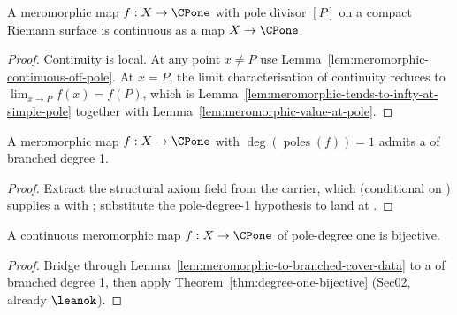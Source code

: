 \begin{theorem}
\label{thm:meromorphic-continuous-extension}
A meromorphic map \(f:X\to\CPone\) with pole divisor \([P]\) on a
compact Riemann surface is continuous as a map \(X\to\CPone\).
\leanok
\end{theorem}
\begin{proof}\leanok
Continuity is local. At any point \(x\neq P\) use
Lemma~\ref{lem:meromorphic-continuous-off-pole}. At \(x=P\), the
limit characterisation of continuity reduces to
\(\lim_{x\to P}f(x)=f(P)\), which is
Lemma~\ref{lem:meromorphic-tends-to-infty-at-simple-pole} together
with Lemma~\ref{lem:meromorphic-value-at-pole}.
\end{proof}

\begin{lemma}
\label{lem:meromorphic-to-branched-cover-data}
A meromorphic map \(f:X\to\CPone\) with \(\deg(\operatorname{poles}(f))=1\) admits a
 of branched degree 1.
\leanok
\end{lemma}
\begin{proof}
\leanok
Extract the structural axiom field
 from the
 carrier, which (conditional on
) supplies a  with
; substitute the
pole-degree-1 hypothesis to land at .
\end{proof}


\begin{theorem}
\label{thm:degree-one-bijectivity-meromorphic}
A continuous meromorphic map \(f:X\to\CPone\) of pole-degree one is
bijective.
\leanok
\end{theorem}
\begin{proof}\leanok
Bridge through Lemma~\ref{lem:meromorphic-to-branched-cover-data} to a
 of branched degree 1, then apply
Theorem~\ref{thm:degree-one-bijective} (Sec02, already \(\leanok\)).
\end{proof}

